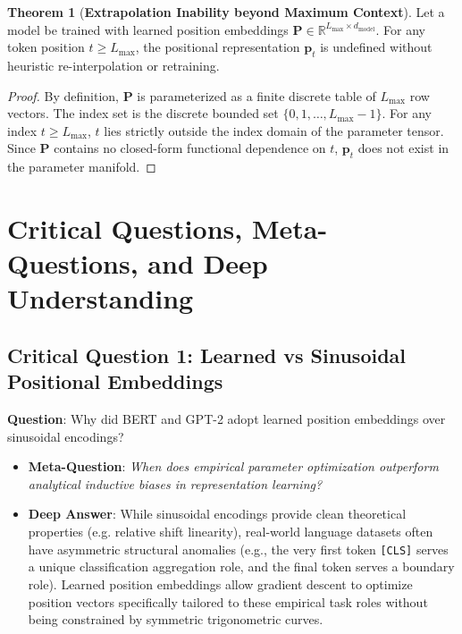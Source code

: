 \documentclass[11pt,a4paper]{article}
\theoremstyle{definition}
\newtheorem{theorem}{\textbf{Theorem}}[section]
\begin{document}
\begin{theorem}[\textbf{Extrapolation Inability beyond Maximum Context}]
Let a model be trained with learned position embeddings $\mathbf{P} \in \mathbb{R}^{L_{\text{max}} \times d_{\text{model}}}$. For any token position $t \ge L_{\text{max}}$, the positional representation $\mathbf{p}_t$ is undefined without heuristic re-interpolation or retraining.
\end{theorem}

\begin{proof}
By definition, $\mathbf{P}$ is parameterized as a finite discrete table of $L_{\text{max}}$ row vectors.
The index set is the discrete bounded set $\{0, 1, \dots, L_{\text{max}} - 1\}$.
For any index $t \ge L_{\text{max}}$, $t$ lies strictly outside the index domain of the parameter tensor.
Since $\mathbf{P}$ contains no closed-form functional dependence on $t$, $\mathbf{p}_t$ does not exist in the parameter manifold.
\end{proof}

\section{Critical Questions, Meta-Questions, and Deep Understanding}

\subsection{\textbf{Critical Question 1: Learned vs Sinusoidal Positional Embeddings}}
\textbf{Question}: Why did BERT and GPT-2 adopt learned position embeddings over sinusoidal encodings?
\begin{itemize}
    \item \textbf{Meta-Question}: \emph{When does empirical parameter optimization outperform analytical inductive biases in representation learning?}
    \item \textbf{Deep Answer}: While sinusoidal encodings provide clean theoretical properties (e.g. relative shift linearity), real-world language datasets often have asymmetric structural anomalies (e.g., the very first token \texttt{[CLS]} serves a unique classification aggregation role, and the final token serves a boundary role). Learned position embeddings allow gradient descent to optimize position vectors specifically tailored to these empirical task roles without being constrained by symmetric trigonometric curves.
\end{itemize}
\end{document}
